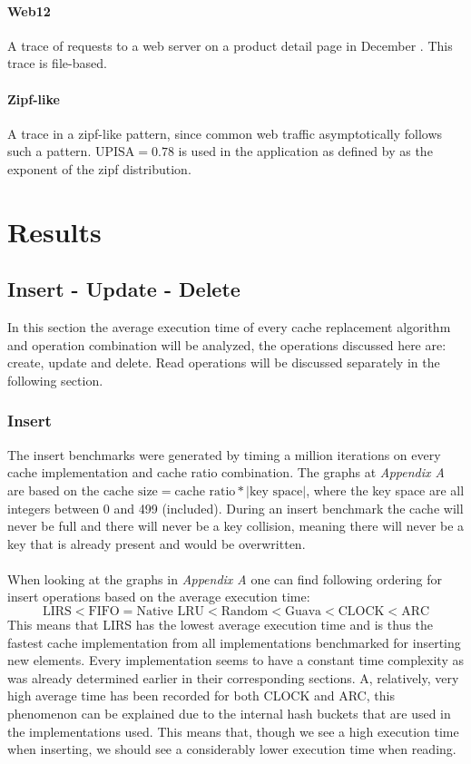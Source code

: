\documentclass[pdftex,a4paper,12pt,twoside]{report}
\begin{document}
\paragraph{Web12} A trace of requests to a web server on a product detail page in December \citep{cache2k_web12}. This trace is file-based.
\paragraph{Zipf-like} A trace in a zipf-like pattern, since common web traffic asymptotically follows such a pattern. $\text{UPISA} = 0.78$ is used in the application as defined by \cite{breslau1999web} as the exponent of the zipf distribution.
\section{Results}
\subsection{Insert - Update - Delete}
In this section the average execution time of every cache replacement algorithm and operation combination will be analyzed, the operations discussed here are: create, update and delete. Read operations will be discussed separately in the following section.
\subsubsection{Insert}
The insert benchmarks were generated by timing a million iterations on every cache implementation and cache ratio combination. The graphs at \emph{Appendix A} are based on the $\text{cache size} = \text{cache ratio} * \left\vert{\text{key space}}\right\vert$, where the key space are all integers between 0 and 499 (included). During an insert benchmark the cache will never be full and there will never be a key collision, meaning there will never be a key that is already present and would be overwritten.
\\\\
When looking at the graphs in \emph{Appendix A} one can find following ordering for insert operations based on the average execution time:
\[
\text{LIRS} < \text{FIFO} = \text{Native LRU} < \text{Random} < \text{Guava} < \text{CLOCK} < \text{ARC}
\]
This means that LIRS has the lowest average execution time and is thus the fastest cache implementation from all implementations benchmarked for inserting new elements.
Every implementation seems to have a constant time complexity as was already determined earlier in their corresponding sections. A, relatively, very high average time has been recorded for both CLOCK and ARC, this phenomenon can be explained due to the internal hash buckets that are used in the implementations used. This means that, though we see a high execution time when inserting, we should see a considerably lower execution time when reading.
\end{document}
